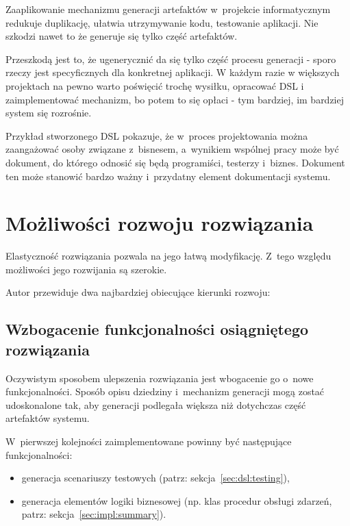 Zaaplikowanie mechanizmu generacji artefaktów w~projekcie informatycznym redukuje duplikację, ułatwia utrzymywanie kodu, testowanie aplikacji.
Nie szkodzi nawet to że generuje się tylko część artefaktów.

Przeszkodą jest to, że ugenerycznić da się tylko część procesu generacji - sporo rzeczy jest specyficznych dla konkretnej aplikacji.
W każdym razie w większych projektach na pewno warto poświęcić trochę wysiłku, opracować DSL i zaimplementować mechanizm, bo potem to się opłaci - tym bardziej, im bardziej system się rozrośnie.

Przykład stworzonego DSL pokazuje, że w~proces projektowania można zaangażować osoby związane z~bisnesem, a~wynikiem wspólnej pracy może być dokument, do którego odnosić się będą programiści, testerzy i~biznes.
Dokument ten może stanowić bardzo ważny i~przydatny element dokumentacji systemu.



\section{Możliwości rozwoju rozwiązania}

Elastyczność rozwiązania pozwala na jego łatwą modyfikację.
Z~tego względu możliwości jego rozwijania są szerokie.

Autor przewiduje dwa najbardziej obiecujące kierunki rozwoju:


\subsection{Wzbogacenie funkcjonalności osiągniętego rozwiązania}

Oczywistym sposobem ulepszenia rozwiązania jest wbogacenie go o~nowe funkcjonalności.
Sposób opisu dziedziny i~mechanizm generacji mogą zostać udoskonalone tak, aby generacji podlegała większa niż dotychczas część artefaktów systemu.

W~pierwszej kolejności zaimplementowane powinny być następujące funkcjonalności:

\begin{itemize}
 \item generacja scenariuszy testowych (patrz: sekcja~\ref{sec:dsl:testing}),
 \item generacja elementów logiki biznesowej (np. klas procedur obsługi zdarzeń, patrz: sekcja~\ref{sec:impl:summary}).
\end{itemize}


